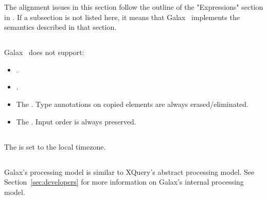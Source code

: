 The alignment issues in this section follow the outline of the
"Expressions" section in .  If a
subsection is not listed here, it means that Galax \version\ implements
the semantics described in that section.

\subsection*{}

   Galax \version\ does not support:
\begin{itemize}
\item {}.
\item {}.
\item The .  Type annotations on copied
  elements are always erased/eliminated. 
\item The .  Input order is always preserved. 
\end{itemize}

\subsection*{}
The  is set to the local timezone. 

\subsection*{}

Galax's processing model is similar to XQuery's abstract processing
model.  See Section~\ref{sec:developers} for more information on
Galax's internal processing model. 

\subsection*{}

\subsection*{}

